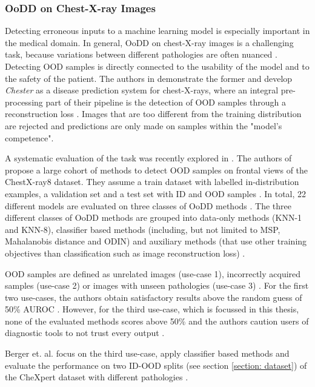 \subsubsection{OoDD on Chest-X-ray Images}
\label{section: OoDD on Chest-X-ray Images}
Detecting erroneous inputs to a machine learning model is especially important in the medical domain.
In general, OoDD on chest-X-ray images is a challenging task, because variations between different pathologies are often nuanced \citep{Salehi2022}.
Detecting OOD samples is directly connected to the usability of the model and to the safety of the patient.
The authors in \citep{Cohen2019} demonstrate the former and develop \textit{Chester} as a disease prediction system for chest-X-rays, where an integral pre-processing part of their pipeline is the detection of OOD samples through a reconstruction loss \citep{Dumoulin2017}. 
Images that are too different from the training distribution are rejected \citep{Cohen2019} and predictions are only made on samples within the "model's competence".
\par
A systematic evaluation of the task was recently explored in \citep{Cao2020}.
The authors of \citep{Cao2020} propose a large cohort of methods to detect OOD samples on frontal views of the ChestX-ray8 \citep{Wang2017} dataset.
They assume a train dataset with labelled in-distribution examples, a validation set and a test set with ID and OOD samples \citep{Cao2020}.
In total, 22 different models are evaluated on three classes of OoDD methods \citep{Cao2020}.
The three different classes of OoDD methods are grouped into data-only methods (KNN-1 and KNN-8), classifier based methods (including, but not limited to MSP, Mahalanobis distance and ODIN) and auxiliary methods (that use other training objectives than classification such as image reconstruction loss) \citep{Cao2020}.
\par
OOD samples are defined as unrelated images (use-case 1), incorrectly acquired samples (use-case 2) or images with unseen pathologies (use-case 3) \citep{Cao2020}.
For the first two use-cases, the authors obtain satisfactory results above the random guess of 50\% AUROC \citep{Cao2020}.
However, for the third use-case, which is focussed in this thesis, none of the evaluated methods scores above 50\% and the authors caution users of diagnostic tools to not trust every output \citep{Cao2020}.
\par
Berger et. al. focus \citep{Berger2021} on the third use-case, apply classifier based methods and evaluate the performance on two ID-OOD splits (see section \ref{section: dataset}) of the CheXpert dataset \citep{Irvin2019} with different pathologies \citep{Berger2021}.
